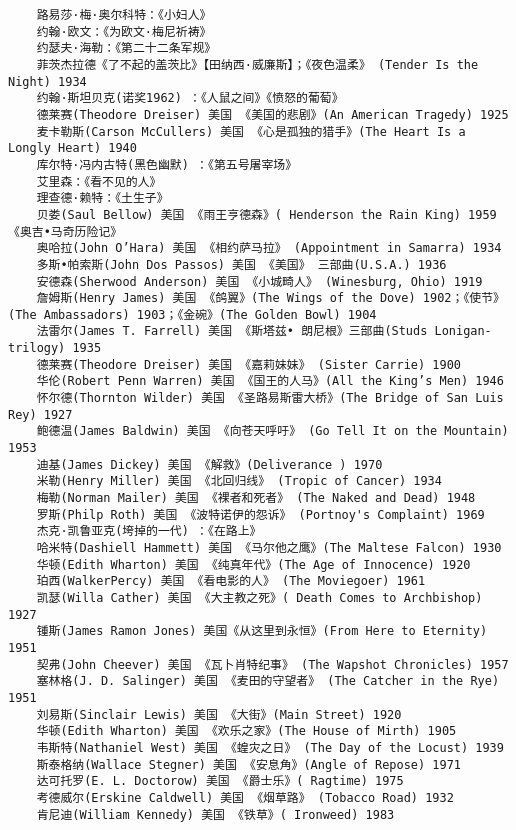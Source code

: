 \documentclass[UTF8]{../RepresentationUniverse}
\begin{document}
\begin{lstlisting}
    路易莎·梅·奥尔科特：《小妇人》
    约翰·欧文：《为欧文·梅尼祈祷》
    约瑟夫·海勒：《第二十二条军规》
    菲茨杰拉德《了不起的盖茨比》【田纳西·威廉斯】；《夜色温柔》 (Tender Is the Night) 1934
    约翰·斯坦贝克(诺奖1962) ：《人鼠之间》《愤怒的葡萄》
    德莱赛(Theodore Dreiser) 美国 《美国的悲剧》(An American Tragedy) 1925
    麦卡勒斯(Carson McCullers) 美国 《心是孤独的猎手》(The Heart Is a Longly Heart) 1940
    库尔特·冯内古特(黑色幽默) ：《第五号屠宰场》
    艾里森：《看不见的人》
    理查德·赖特：《土生子》
    贝娄(Saul Bellow) 美国 《雨王亨德森》( Henderson the Rain King) 1959《奥吉•马奇历险记》
    奥哈拉(John O’Hara) 美国 《相约萨马拉》 (Appointment in Samarra) 1934
    多斯•帕索斯(John Dos Passos) 美国 《美国》 三部曲(U.S.A.) 1936
    安德森(Sherwood Anderson) 美国 《小城畸人》 (Winesburg, Ohio) 1919
    詹姆斯(Henry James) 美国 《鸽翼》(The Wings of the Dove) 1902；《使节》(The Ambassadors) 1903；《金碗》(The Golden Bowl) 1904
    法雷尔(James T. Farrell) 美国 《斯塔兹• 朗尼根》三部曲(Studs Lonigan-trilogy) 1935
    德莱赛(Theodore Dreiser) 美国 《嘉莉妹妹》 (Sister Carrie) 1900
    华伦(Robert Penn Warren) 美国 《国王的人马》(All the King’s Men) 1946
    怀尔德(Thornton Wilder) 美国 《圣路易斯雷大桥》(The Bridge of San Luis Rey) 1927
    鲍德温(James Baldwin) 美国 《向苍天呼吁》 (Go Tell It on the Mountain) 1953
    迪基(James Dickey) 美国 《解救》(Deliverance ) 1970
    米勒(Henry Miller) 美国 《北回归线》 (Tropic of Cancer) 1934
    梅勒(Norman Mailer) 美国 《裸者和死者》 (The Naked and Dead) 1948
    罗斯(Philp Roth) 美国 《波特诺伊的怨诉》 (Portnoy's Complaint) 1969
    杰克·凯鲁亚克(垮掉的一代) ：《在路上》
    哈米特(Dashiell Hammett) 美国 《马尔他之鹰》(The Maltese Falcon) 1930
    华顿(Edith Wharton) 美国 《纯真年代》(The Age of Innocence) 1920
    珀西(WalkerPercy) 美国 《看电影的人》 (The Moviegoer) 1961
    凯瑟(Willa Cather) 美国 《大主教之死》( Death Comes to Archbishop) 1927
    锺斯(James Ramon Jones) 美国《从这里到永恒》(From Here to Eternity) 1951
    契弗(John Cheever) 美国 《瓦卜肖特纪事》 (The Wapshot Chronicles) 1957
    塞林格(J. D. Salinger) 美国 《麦田的守望者》 (The Catcher in the Rye) 1951
    刘易斯(Sinclair Lewis) 美国 《大街》(Main Street) 1920
    华顿(Edith Wharton) 美国 《欢乐之家》(The House of Mirth) 1905
    韦斯特(Nathaniel West) 美国 《蝗灾之日》 (The Day of the Locust) 1939
    斯泰格纳(Wallace Stegner) 美国 《安息角》(Angle of Repose) 1971
    达可托罗(E. L. Doctorow) 美国 《爵士乐》( Ragtime) 1975
    考德威尔(Erskine Caldwell) 美国 《烟草路》 (Tobacco Road) 1932
    肯尼迪(William Kennedy) 美国 《铁草》( Ironweed) 1983

\end{lstlisting}
\end{document}

